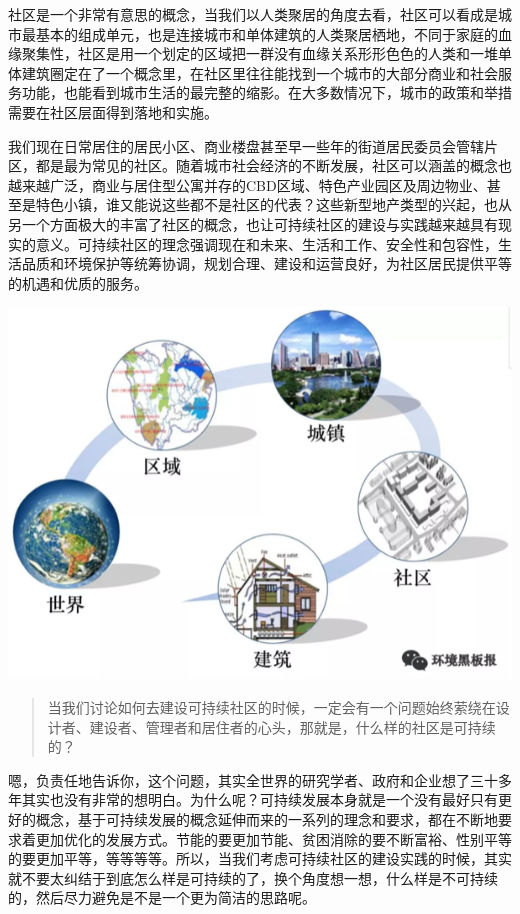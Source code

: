 \documentclass[
]{book}
\begin{document}
社区是一个非常有意思的概念，当我们以人类聚居的角度去看，社区可以看成是城市最基本的组成单元，也是连接城市和单体建筑的人类聚居栖地，不同于家庭的血缘聚集性，社区是用一个划定的区域把一群没有血缘关系形形色色的人类和一堆单体建筑圈定在了一个概念里，在社区里往往能找到一个城市的大部分商业和社会服务功能，也能看到城市生活的最完整的缩影。在大多数情况下，城市的政策和举措需要在社区层面得到落地和实施。

我们现在日常居住的居民小区、商业楼盘甚至早一些年的街道居民委员会管辖片区，都是最为常见的社区。随着城市社会经济的不断发展，社区可以涵盖的概念也越来越广泛，商业与居住型公寓并存的CBD区域、特色产业园区及周边物业、甚至是特色小镇，谁又能说这些都不是社区的代表？这些新型地产类型的兴起，也从另一个方面极大的丰富了社区的概念，也让可持续社区的建设与实践越来越具有现实的意义。可持续社区的理念强调现在和未来、生活和工作、安全性和包容性，生活品质和环境保护等统筹协调，规划合理、建设和运营良好，为社区居民提供平等的机遇和优质的服务。

\includegraphics[width=8.33in]{images/moma2}

\begin{quote}
当我们讨论如何去建设可持续社区的时候，一定会有一个问题始终萦绕在设计者、建设者、管理者和居住者的心头，那就是，什么样的社区是可持续的？
\end{quote}

嗯，负责任地告诉你，这个问题，其实全世界的研究学者、政府和企业想了三十多年其实也没有非常的想明白。为什么呢？可持续发展本身就是一个没有最好只有更好的概念，基于可持续发展的概念延伸而来的一系列的理念和要求，都在不断地要求着更加优化的发展方式。节能的要更加节能、贫困消除的要不断富裕、性别平等的要更加平等，等等等等。所以，当我们考虑可持续社区的建设实践的时候，其实就不要太纠结于到底怎么样是可持续的了，换个角度想一想，什么样是不可持续的，然后尽力避免是不是一个更为简洁的思路呢。
\end{document}
